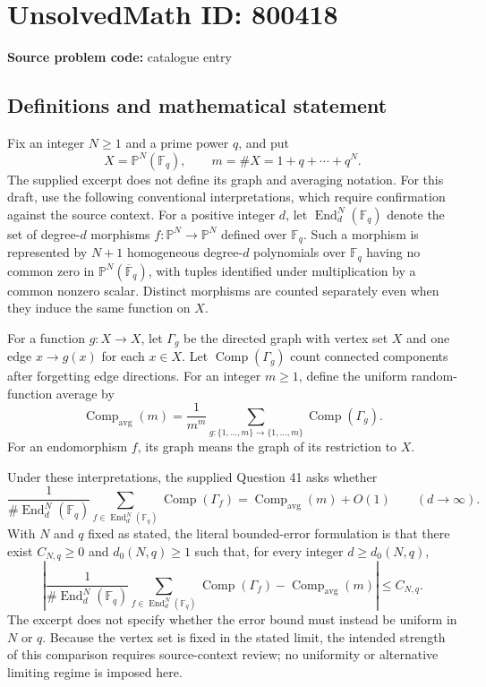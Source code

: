 \documentclass[11pt]{article}
\newcommand{\F}{\mathbb{F}}
\newcommand{\PP}{\mathbb{P}}
\begin{document}
\section*{UnsolvedMath ID: 800418}
\textbf{Source problem code:} catalogue entry
\subsection{Definitions and mathematical statement}
Fix an integer \(N\geq 1\) and a prime power \(q\), and put
\[
X=\PP^N(\F_q),\qquad m=\#X=1+q+\cdots+q^N.
\]
The supplied excerpt does not define its graph and averaging notation. For this draft, use the following conventional interpretations, which require confirmation against the source context. For a positive integer \(d\), let \(\operatorname{End}_d^N(\F_q)\) denote the set of degree-\(d\) morphisms \(f:\PP^N\to\PP^N\) defined over \(\F_q\). Such a morphism is represented by \(N+1\) homogeneous degree-\(d\) polynomials over \(\F_q\) having no common zero in \(\PP^N(\overline{\F}_q)\), with tuples identified under multiplication by a common nonzero scalar. Distinct morphisms are counted separately even when they induce the same function on \(X\).

For a function \(g:X\to X\), let \(\Gamma_g\) be the directed graph with vertex set \(X\) and one edge \(x\to g(x)\) for each \(x\in X\). Let \(\operatorname{Comp}(\Gamma_g)\) count connected components after forgetting edge directions. For an integer \(m\geq1\), define the uniform random-function average by
\[
\operatorname{Comp}_{\mathrm{avg}}(m)
=\frac{1}{m^m}\sum_{g:\{1,\ldots,m\}\to\{1,\ldots,m\}}
\operatorname{Comp}(\Gamma_g).
\]
For an endomorphism \(f\), its graph means the graph of its restriction to \(X\).

Under these interpretations, the supplied Question 41 asks whether
\[
\frac{1}{\#\operatorname{End}_d^N(\F_q)}
\sum_{f\in\operatorname{End}_d^N(\F_q)}
\operatorname{Comp}(\Gamma_f)
=\operatorname{Comp}_{\mathrm{avg}}(m)+O(1)
\qquad(d\to\infty).
\]
With \(N\) and \(q\) fixed as stated, the literal bounded-error formulation is that there exist \(C_{N,q}\geq0\) and \(d_0(N,q)\geq1\) such that, for every integer \(d\geq d_0(N,q)\),
\[
\left|
\frac{1}{\#\operatorname{End}_d^N(\F_q)}
\sum_{f\in\operatorname{End}_d^N(\F_q)}
\operatorname{Comp}(\Gamma_f)
-\operatorname{Comp}_{\mathrm{avg}}(m)
\right|\leq C_{N,q}.
\]
The excerpt does not specify whether the error bound must instead be uniform in \(N\) or \(q\). Because the vertex set is fixed in the stated limit, the intended strength of this comparison requires source-context review; no uniformity or alternative limiting regime is imposed here.
\end{document}
